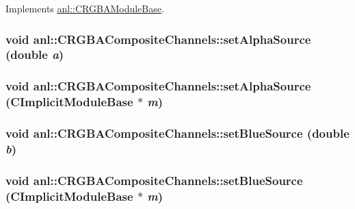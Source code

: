 Implements \hyperlink{classanl_1_1CRGBAModuleBase_afb6896d38ae92b9bb784fe5dc731ae67}{anl::CRGBAModuleBase}.\hypertarget{classanl_1_1CRGBACompositeChannels_a647af6a0a510cd42882ed6ebc6c6e23b}{
\subsubsection[{setAlphaSource}]{\setlength{\rightskip}{0pt plus 5cm}void anl::CRGBACompositeChannels::setAlphaSource (double {\em a})}}
\label{classanl_1_1CRGBACompositeChannels_a647af6a0a510cd42882ed6ebc6c6e23b}
\hypertarget{classanl_1_1CRGBACompositeChannels_a58b16b0f4bc75a29de4cfe4bb4f1e79f}{
\subsubsection[{setAlphaSource}]{\setlength{\rightskip}{0pt plus 5cm}void anl::CRGBACompositeChannels::setAlphaSource ({\bf CImplicitModuleBase} $\ast$ {\em m})}}
\label{classanl_1_1CRGBACompositeChannels_a58b16b0f4bc75a29de4cfe4bb4f1e79f}
\hypertarget{classanl_1_1CRGBACompositeChannels_a0ee9217cb51a7732e6fdd262fda1888c}{
\subsubsection[{setBlueSource}]{\setlength{\rightskip}{0pt plus 5cm}void anl::CRGBACompositeChannels::setBlueSource (double {\em b})}}
\label{classanl_1_1CRGBACompositeChannels_a0ee9217cb51a7732e6fdd262fda1888c}
\hypertarget{classanl_1_1CRGBACompositeChannels_a77a094b9b2de02ada1780b8ee9e47cb9}{
\subsubsection[{setBlueSource}]{\setlength{\rightskip}{0pt plus 5cm}void anl::CRGBACompositeChannels::setBlueSource ({\bf CImplicitModuleBase} $\ast$ {\em m})}}
